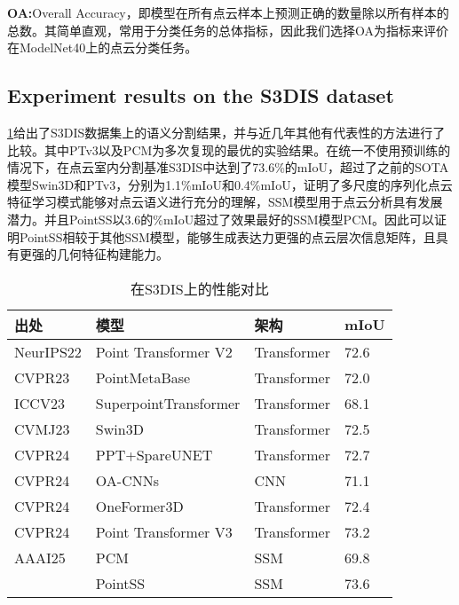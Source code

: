 \documentclass[preprint,12pt]{elsarticle}
\begin{document}
\textbf{OA:}Overall Accuracy，即模型在所有点云样本上预测正确的数量除以所有样本的总数。其简单直观，常用于分类任务的总体指标，因此我们选择OA为指标来评价在ModelNet40上的点云分类任务。

\subsection{Experiment results on the S3DIS dataset}
\cref{tab:s3dis}给出了S3DIS数据集上的语义分割结果，并与近几年其他有代表性的方法进行了比较。其中PTv3以及PCM为多次复现的最优的实验结果。在统一不使用预训练的情况下，在点云室内分割基准S3DIS中达到了73.6\%的mIoU，超过了之前的SOTA模型Swin3D和PTv3，分别为1.1\%mIoU和0.4\%mIoU，证明了多尺度的序列化点云特征学习模式能够对点云语义进行充分的理解，SSM模型用于点云分析具有发展潜力。并且PointSS以3.6的\%mIoU超过了效果最好的SSM模型PCM。因此可以证明PointSS相较于其他SSM模型，能够生成表达力更强的点云层次信息矩阵，且具有更强的几何特征构建能力。
\begin{table}[htbp!]
	\caption{在S3DIS上的性能对比}
\label{tab:s3dis}
	\begin{tabular}{@{}llll@{}}
		\toprule
		\textbf{出处}  & \textbf{模型}           & \textbf{架构} & \textbf{mIoU} \\ \midrule
		NeurIPS22 & Point Transformer V2\cite{ptv2}  & Transformer & 72.6          \\
		CVPR23     & PointMetaBase\cite{pmb}         & Transformer & 72.0          \\
		ICCV23     & SuperpointTransformer\cite{spt} & Transformer & 68.1          \\
		CVMJ23     & Swin3D\cite{Swin3D}                & Transformer & 72.5          \\
		CVPR24     & PPT+SpareUNET\cite{ppt}         & Transformer & 72.7          \\
		CVPR24     & OA-CNNs\cite{oacnn}               & CNN         & 71.1          \\
		CVPR24     & OneFormer3D\cite{OneFormer3D}           & Transformer & 72.4          \\
		CVPR24     & Point Transformer V3\cite{ptv3}           & Transformer & 73.2          \\
		AAAI25    & PCM\cite{pcm}                   & SSM         & 69.8         \\
		& PointSS               &SSM           & 73.6          \\ \bottomrule
	\end{tabular}
		\centering
	

\end{table}
\end{document}

